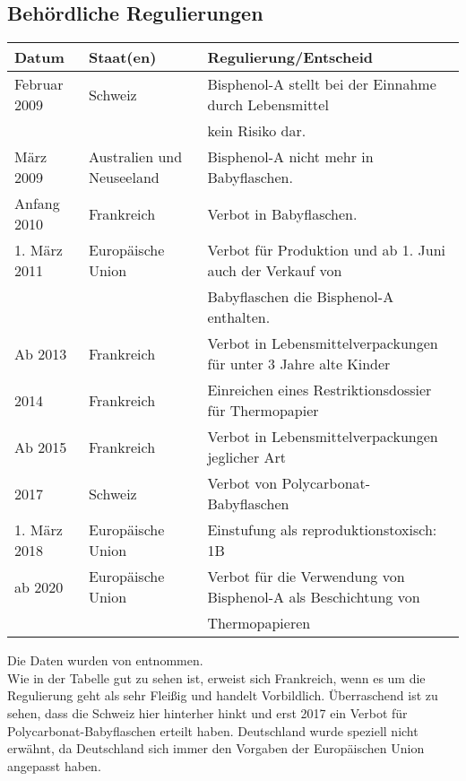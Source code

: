 \subsection{Behördliche Regulierungen}
\begin{tabular} [h]{l|l|l}
Datum & Staat(en) & Regulierung/Entscheid\\
\hline
Februar 2009 & Schweiz & Bisphenol-A stellt bei der Einnahme durch Lebensmittel\\
& & kein Risiko dar. \\
\hline
März 2009 & Australien und Neuseeland & Bisphenol-A nicht mehr in Babyflaschen. \\
\hline
Anfang 2010 & Frankreich & Verbot in Babyflaschen.\\
\hline
1. März 2011 & Europäische Union & Verbot für Produktion und ab 1. Juni auch der Verkauf von\\ &&Babyflaschen die Bisphenol-A enthalten. \\
\hline
Ab 2013 & Frankreich & Verbot in Lebensmittelverpackungen für unter 3 Jahre alte Kinder \\
\hline
2014 & Frankreich & Einreichen eines Restriktionsdossier für Thermopapier \\
\hline
Ab 2015 & Frankreich & Verbot in Lebensmittelverpackungen jeglicher Art \\
\hline
2017 & Schweiz & Verbot von Polycarbonat-Babyflaschen\\
\hline
1. März 2018 & Europäische Union & Einstufung als reproduktionstoxisch: 1B \\
\hline
ab 2020 & Europäische Union & Verbot für die Verwendung von Bisphenol-A als Beschichtung von\\
&&Thermopapieren\\
\end{tabular}
Die Daten wurden von \cite{Wikipedia} entnommen.\\
Wie in der Tabelle gut zu sehen ist, erweist sich Frankreich, wenn es um die Regulierung geht als sehr Fleißig und handelt Vorbildlich. Überraschend ist zu sehen, dass die Schweiz hier hinterher hinkt und erst 2017 ein Verbot für Polycarbonat-Babyflaschen erteilt haben. Deutschland wurde speziell nicht erwähnt, da Deutschland sich immer den Vorgaben der Europäischen Union angepasst haben.


